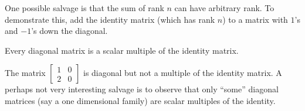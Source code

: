 \documentclass{homework}
\begin{document}
\begin{solution}
  One possible salvage is that the sum of rank $n$ can have arbitrary
  rank.  To demonstrate this, add the identity matrix (which has rank
  $n$) to a matrix with $1$'s and $-1$'s down the diagonal.
\end{solution}

\begin{problem}
  Every diagonal matrix is a scalar multiple of the identity matrix.
\end{problem}

\begin{solution}
  The matrix $\begin{bmatrix} 1 & 0 \\ 2 & 0 \end{bmatrix}$ is
  diagonal but not a multiple of the identity matrix.  A perhaps not
  very interesting salvage is to observe that only ``some'' diagonal
  matrices (say a one dimensional family) are scalar multiples of the
  identity.
\end{solution}
\end{document}
